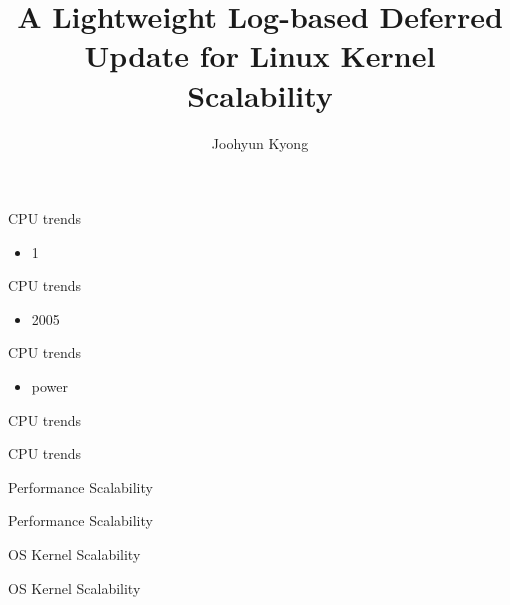 \documentclass[english]{beamer} %
\begin{document}
\title[Memory Scalability]{
A Lightweight Log-based Deferred Update for Linux Kernel
Scalability}

\author{Joohyun Kyong}


\begin{frame}
  \titlepage
\end{frame}

\begin{frame}{CPU trends}
	\begin{itemize}
	\item 1
	\end{itemize}
\end{frame}


\begin{frame}{CPU trends}
	\begin{itemize}
	\item 2005
	\end{itemize}
\end{frame}

\begin{frame}{CPU trends}
	\begin{itemize}
	\item power
	\end{itemize}
\end{frame}


\begin{frame}{CPU trends}
\end{frame}


\begin{frame}{CPU trends}
\end{frame}


\begin{frame}{Performance Scalability}
\end{frame}


\begin{frame}{Performance Scalability}
\end{frame}


\begin{frame}{OS Kernel Scalability}
\end{frame}


\begin{frame}{OS Kernel Scalability}
\end{frame}
\end{document}
